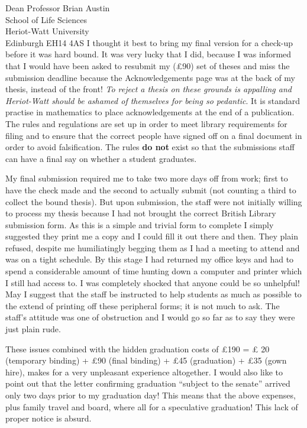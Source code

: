 \documentclass[10pt]{letter}
\begin{document}
\begin{letter}{Dean Professor Brian Austin\\
School of Life Sciences\\
Heriot-Watt University\\
Edinburgh EH14 4AS}
I thought it best to bring my final version for a check-up before it was hard
bound. It was very lucky that I did, because I was informed that I would have
been asked to resubmit my (\pounds 90) set of theses and miss the submission
deadline because the Acknowledgements page was at the back of my thesis, instead
of the front! \textit{To reject a thesis on these grounds is appalling and
  Heriot-Watt should be ashamed of themselves for being so pedantic}. It is
standard practise in mathematics to place acknowledgements at the end of a
publication. The rules and regulations are set up in order to meet library
requirements for filing and to ensure that the correct people have signed off on
a final document in order to avoid falsification. The rules \textbf{do not}
exist so that the submissions staff can have a final say on whether a student
graduates.

My final submission required me to take two more days off from work; first to
have the check made and the second to actually submit (not counting a third to
collect the bound thesis). But upon submission, the staff were not initially
willing to process my thesis because I had not brought the correct British
Library submission form. As this is a simple and trivial form to complete I
simply suggested they print me a copy and I could fill it out there and then.
They plain refused, despite me humiliatingly begging them as I had a meeting to
attend and was on a tight schedule. By this stage I had returned my office keys
and had to spend a considerable amount of time hunting down a computer and
printer which I still had access to. I was completely shocked that anyone could
be so unhelpful! May I suggest that the staff be instructed to help students as
much as possible to the extend of printing off these peripheral forms; it is not
much to ask. The staff's attitude was one of obstruction and I would go so far
as to say they were just plain rude.

These issues combined with the hidden graduation costs of \pounds 190 = \pounds
20 (temporary binding) + \pounds 90 (final binding) + \pounds 45 (graduation) +
\pounds 35 (gown hire), makes for a very unpleasant experience altogether. I
would also like to point out that the letter confirming graduation ``subject to
the senate'' arrived only two days prior to my graduation day! This means that
the above expenses, plus family travel and board, where all for a speculative
graduation! This lack of proper notice is absurd.


\end{letter}
\end{document}
